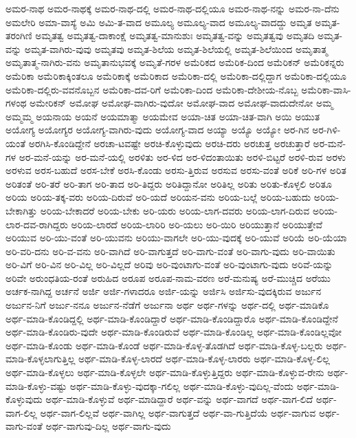 {ಅಮರ-ನಾಥ
ಅಮರ-ನಾಥಕ್ಕೆ
ಅಮರ-ನಾಥ-ದಲ್ಲಿ
ಅಮರ-ನಾಥ-ದಲ್ಲಿಯೂ
ಅಮರ-ನಾಥ-ನನ್ನು
ಅಮರ-ನಾ-ದೆನು
ಅಮಲೇರಿ
ಅಮಾ-ವಾಸ್ಯೆ
ಅಮಿ
ಅಮಿ-ತ-ವಾದ
ಅಮೂಲ್ಯ
ಅಮೂಲ್ಯ-ವಾದ
ಅಮೂಲ್ಯ-ವಾದದ್ದು
ಅಮೃತ
ಅಮೃತ-ತರಂಗಿಣಿ
ಅಮೃತತ್ವ
ಅಮೃತತ್ವ-ದಾಕಾಂಕ್ಷೆ
ಅಮೃತತ್ವ-ಮಾನುಶುಃ
ಅಮೃತತ್ವ-ವನ್ನು
ಅಮೃತತ್ವವು
ಅಮೃತದಿ
ಅಮೃತ-ವನ್ನು
ಅಮೃತ-ವಾಗಿರು-ವುವು
ಅಮೃತವು
ಅಮೃತ-ಶಿಲೆಯ
ಅಮೃತ-ಶಿಲೆಯಲ್ಲಿ
ಅಮೃತ-ಶಿಲೆಯಿಂದ
ಅಮೃತಾತ್ಮ
ಅಮೃತಾತ್ಮ-ನಾಗಿರು-ವನು
ಅಮೃತಾನುಭವಕ್ಕೆ
ಅಮೃತೆ-ಗರಳ
ಅಮೆರಿಕದ
ಅಮೆರಿಕ-ದಿಂದ
ಅಮೆರಿಕನ್
ಅಮೆರಿಕನ್ನರು
ಅಮೆರಿಕಾ
ಅಮೆರಿಕಾಕ್ಕಿಂತಲೂ
ಅಮೆರಿಕಾಕ್ಕೆ
ಅಮೆರಿಕಾದ
ಅಮೆರಿಕಾ-ದಲ್ಲಿ
ಅಮೆರಿಕಾ-ದಲ್ಲಿದ್ದಾಗ
ಅಮೆರಿಕಾ-ದಲ್ಲಿಯೂ
ಅಮೆರಿಕಾ-ದಲ್ಲಿರು-ವವನೊಬ್ಬನ
ಅಮೆರಿಕಾ-ದವ-ರಿಗೆ
ಅಮೆರಿಕಾ-ದಿಂದ
ಅಮೆರಿಕಾ-ದೇಶೀಯ-ನೊಬ್ಬ
ಅಮೆರಿಕಾ-ವಾಸಿ-ಗಳಂಥ
ಅಮೇರಿಕನ್
ಅಮೋಘ
ಅಮೋಘ-ವಾಗಿರು-ವುದೋ
ಅಮೋಘ-ವಾದ
ಅಮೋಘ-ವಾದುದೇನೋ
ಅಮ್ಮ
ಅಮ್ಮಮ್ಮ
ಅಯನಾಯ
ಅಯನೆ
ಅಯಮಾತ್ಮಾ
ಅಯಮೇವ
ಅಯಾ-ಚಿತ
ಅಯಾ-ಚಿತ-ವಾಗಿ
ಅಯಿ
ಅಯುತ
ಅಯೋಗ್ಯ
ಅಯೋಗ್ಯರ
ಅಯೋಗ್ಯ-ವಾಗಿರು-ವುದು
ಅಯೋಗ್ಯ-ವಾದ
ಅಯ್ಯಾ
ಅಯ್ಯೊ
ಅಯ್ಯೋ
ಅರ-ಗಿನ
ಅರ-ಗಿಳಿ-ಯಂತೆ
ಅರಗಿಸಿ-ಕೊಂಡಿದ್ದೇನೆ
ಅರಚಾ-ಟವಷ್ಟೇ
ಅರಚಿ-ಕೊಳ್ಳುವುದು
ಅರಚಿ-ದರು
ಅರಚುತ್ತ
ಅರಚುತ್ತಾರೆ
ಅರ-ಮನೆ-ಗಳ
ಅರ-ಮನೆ-ಯನ್ನು
ಅರ-ಮನೆ-ಯಲ್ಲಿ
ಅರಳಿತು
ಅರ-ಳಿದ
ಅರ-ಳಿದಂತಾಯಿತು
ಅರಳಿ-ಬಿಟ್ಟರೆ
ಅರಳಿ-ರುವ
ಅರಳು
ಅರಳುವ
ಅರಸ-ಬಹುದೆ
ಅರಸ-ಬೇಕೆ
ಅರಸಿ-ಕೊಂಡು
ಅರಸು-ತ್ತಿರುವ
ಅರಸುವ
ಅರಸು-ವಂತೆ
ಅರಿಕೆ
ಅರಿ-ಗಳ
ಅರಿತ
ಅರಿತಂತೆ
ಅರಿ-ತರೆ
ಅರಿ-ತಾಗ
ಅರಿ-ತಾದ
ಅರಿ-ತಿದ್ದರು
ಅರಿತಿದ್ದಾನೋ
ಅರಿತಿಲ್ಲ
ಅರಿತು
ಅರಿತು-ಕೊಳ್ಳಲಿ
ಅರಿತೂ
ಅರಿಯ
ಅರಿಯ-ತಕ್ಕ-ವರು
ಅರಿಯ-ದಿರುವೆ
ಅರಿ-ಯದೆ
ಅರಿಯನ-ವನು
ಅರಿಯ-ಬಲ್ಲೆ
ಅರಿಯ-ಬಹುದು
ಅರಿಯ-ಬೇಕಾಗಿತ್ತು
ಅರಿಯ-ಬೇಕಾದರೆ
ಅರಿಯ-ಬೇಕು
ಅರಿ-ಯರು
ಅರಿಯ-ಲಾಗ-ದವರು
ಅರಿಯ-ಲಾಗ-ದಿರುವ
ಅರಿಯ-ಲಾರ-ದವ-ರಾಗಿದ್ದರು
ಅರಿಯ-ಲಾರದೆ
ಅರಿಯ-ಲಾರಿರಿ
ಅರಿ-ಯಲು
ಅರಿ-ಯಿರಿ
ಅರಿಯುತ್ತಾನೆ
ಅರಿಯುತ್ತೇವೆ
ಅರಿಯುವ
ಅರಿ-ಯು-ವಂತೆ
ಅರಿ-ಯುವನು
ಅರಿಯು-ವಾಗಲೇ
ಅರಿ-ಯು-ವುದಕ್ಕೆ
ಅರಿ-ಯುವೆ
ಅರಿಯೆ
ಅರಿ-ಯೆಯಾ
ಅರಿ-ವರಿ-ದನು
ಅರಿ-ವ-ವನು
ಅರಿ-ವಾಗಿದೆ
ಅರಿ-ವಾಗುತ್ತದೆ
ಅರಿ-ವಾಗು-ವಂತೆ
ಅರಿ-ವಾಗು-ವುದು
ಅರಿ-ವಾಯಿತು
ಅರಿ-ವಿಗೆ
ಅರಿ-ವಿನ
ಅರಿ-ವಿಲ್ಲ
ಅರಿ-ವಿಲ್ಲದೆ
ಅರಿವು
ಅರಿ-ವುಂಟಾಗು-ವಂತೆ
ಅರಿ-ವುಂಟಾಗು-ವುದು
ಅರಿವೆ-ಯನ್ನು
ಅರಿವೇ
ಅರುಂಧತಿಯ-ರಂತೆ
ಅರುಹಿದ
ಅರೂಪ
ಅರೂಪ-ನಾಮ-ವರಣ
ಅರೆ-ಮನುಷ್ಯ
ಅರೆ-ಮುಚ್ಚಿದ
ಅರೆಯು
ಅರ್ಚಕ-ನಾಗಿದ್ದ
ಅರ್ಚನೆ
ಅರ್ಜಿ
ಅರ್ಜಿ-ಗಳಾದರೂ
ಅರ್ಜಿ-ಯನ್ನು
ಅರ್ಜಿಸಿ
ಅರ್ಜಿಸು-ವುದಕ್ಕಿರುವ
ಅರ್ಜುನ
ಅರ್ಜುನ-ನಿಗೆ
ಅರ್ಜು-ನನೂ
ಅರ್ಜುನ-ನೆಡೆಗೆ
ಅರ್ಜುನಾ
ಅರ್ಥ
ಅರ್ಥ-ಗಳನ್ನು
ಅರ್ಥ-ದಲ್ಲಿ
ಅರ್ಥ-ಮಾಡಿಕೊ
ಅರ್ಥ-ಮಾಡಿ-ಕೊಂಡಿದ್ದಲ್ಲಿ
ಅರ್ಥ-ಮಾಡಿ-ಕೊಂಡಿದ್ದಾರೆ
ಅರ್ಥ-ಮಾಡಿ-ಕೊಂಡಿದ್ದಾರೊ
ಅರ್ಥ-ಮಾಡಿ-ಕೊಂಡಿದ್ದೇನೆ
ಅರ್ಥ-ಮಾಡಿ-ಕೊಂಡಿರು-ವುದೇ
ಅರ್ಥ-ಮಾಡಿ-ಕೊಂಡಿರುವೆ
ಅರ್ಥ-ಮಾಡಿ-ಕೊಂಡಿಲ್ಲ
ಅರ್ಥ-ಮಾಡಿ-ಕೊಂಡಿಲ್ಲವೋ
ಅರ್ಥ-ಮಾಡಿ-ಕೊಂಡು
ಅರ್ಥ-ಮಾಡಿ-ಕೊಂಡೆ
ಅರ್ಥ-ಮಾಡಿ-ಕೊಳ್ಳ-ತೊಡಗಿದೆ
ಅರ್ಥ-ಮಾಡಿ-ಕೊಳ್ಳ-ಬಲ್ಲರು
ಅರ್ಥ-ಮಾಡಿ-ಕೊಳ್ಳಲಾಗುತ್ತಿಲ್ಲ
ಅರ್ಥ-ಮಾಡಿ-ಕೊಳ್ಳ-ಲಾರದೆ
ಅರ್ಥ-ಮಾಡಿ-ಕೊಳ್ಳ-ಲಾರರು
ಅರ್ಥ-ಮಾಡಿ-ಕೊಳ್ಳ-ಲಿಲ್ಲ
ಅರ್ಥ-ಮಾಡಿ-ಕೊಳ್ಳಲು
ಅರ್ಥ-ಮಾಡಿ-ಕೊಳ್ಳಲೇ
ಅರ್ಥ-ಮಾಡಿ-ಕೊಳ್ಳುತ್ತಿದ್ದರು
ಅರ್ಥ-ಮಾಡಿ-ಕೊಳ್ಳುವ-ರೇನು
ಅರ್ಥ-ಮಾಡಿ-ಕೊಳ್ಳು-ವಷ್ಟು
ಅರ್ಥ-ಮಾಡಿ-ಕೊಳ್ಳು-ವುದಕ್ಕಾ-ಗಲಿಲ್ಲ
ಅರ್ಥ-ಮಾಡಿ-ಕೊಳ್ಳು-ವುದಿಲ್ಲ-ವೆಂದು
ಅರ್ಥ-ಮಾಡಿ-ಕೊಳ್ಳುವುದು
ಅರ್ಥ-ಮಾಡಿ-ಕೊಳ್ಳುವೆ
ಅರ್ಥ-ಮಾಡಿದ್ದಾರೆ
ಅರ್ಥ-ವನ್ನು
ಅರ್ಥ-ವಾಗದೆ
ಅರ್ಥ-ವಾಗ-ಲಿದೆ
ಅರ್ಥ-ವಾಗ-ಲಿಲ್ಲ
ಅರ್ಥ-ವಾಗ-ಲಿಲ್ಲವೆ
ಅರ್ಥ-ವಾಗಿಲ್ಲ
ಅರ್ಥ-ವಾಗುತ್ತದೆ
ಅರ್ಥ-ವಾ-ಗುತ್ತಿದೆಯೆ
ಅರ್ಥ-ವಾಗುವ
ಅರ್ಥ-ವಾಗು-ವಂತೆ
ಅರ್ಥ-ವಾಗುವು-ದಿಲ್ಲ
ಅರ್ಥ-ವಾಗು-ವುದು
}
